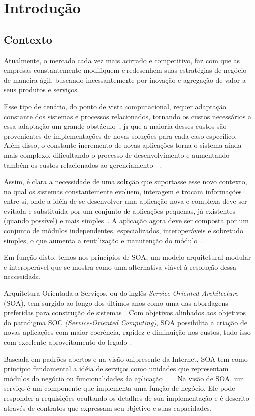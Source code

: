 \chapter{Introdução}
\section{Contexto}
Atualmente, o mercado cada vez mais acirrado e competitivo, faz com que as empresas constantemente modifiquem e redesenhem suas estratégias de negócio de maneira ágil, buscando incessantemente por inovação e agregação de valor a seus produtos e serviços. 

Esse tipo de cenário, do ponto de vista computacional, requer adaptação constante dos sistemas e processos relacionados, tornando os custos necessários a essa adaptação um grande obstáculo~\cite{rabelo2006}, já que a maioria desses custos são provenientes de implementações de novas soluções para cada caso específico. Além disso, o constante incremento de novas aplicações torna o sistema ainda mais complexo, dificultando o processo de desenvolvimento e aumentando também os custos relacionados ao gerenciamento~\cite{rabelo2006}~\cite{ada2006}.

Assim, é clara a necessidade de uma solução que suportasse esse novo contexto, no qual os sistemas constantemente evoluem, interagem e trocam informações entre si, onde a idéia de se desenvolver uma aplicação nova e complexa deve ser evitada e substituída por um conjunto de aplicações pequenas, já existentes (quando possível) e mais simples~\cite{rabelo2006}. A aplicação agora deve ser composta por um conjunto de módulos independentes, especializados, interoperáveis e sobretudo simples, o que aumenta a reutilização e manutenção do módulo~\cite{oracle2005ws}.

Em função disto, temos nos princípios de SOA, um modelo arquitetural modular e interoperável que se mostra como uma alternativa viável à resolução dessa necessidade.

Arquitetura Orientada a Serviços, ou do inglês \textit{Service Oriented Architecture} (SOA), tem surgido ao longo dos últimos anos como uma das abordagens preferidas para construção de sistemas~\cite{erl2008soa}. Com objetivos alinhados aos objetivos do paradigma SOC \textit{(Service-Oriented Computing)}, SOA possibilita a criação de novas aplicações com maior coerência, rapidez e diminuição nos custos, tudo isso com excelente aproveitamento do legado~\cite{erl2008soa}.

Baseada em padrões abertos e na visão onipresente da Internet, SOA tem como princípio fundamental a idéia de serviços como unidades que representam módulos do negócio ou funcionalidades da aplicação~\cite{erl2008soa}~\cite{imb2007soa}~\cite{cervantes2005technical}. Na visão de SOA, um serviço é um componente que implementa uma função de negócio. Ele pode responder a requisições ocultando os detalhes de sua implementação e é descrito através de contratos que expressam seu objetivo e suas capacidades. 

